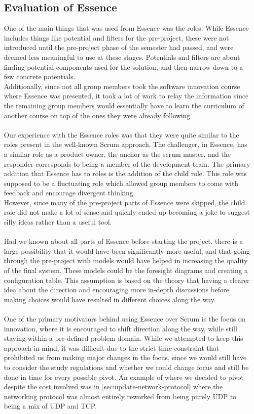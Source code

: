 \subsection{Evaluation of Essence}
One of the main things that was used from Essence was the roles.
While Essence includes things like potential and filters for the pre-project, these were not introduced until the pre-project phase of the semester had passed, and were deemed less meaningful to use at these stages.
Potentials and filters are about finding potential components used for the solution, and then narrow down to a few concrete potentials.\\
Additionally, since not all group members took the software innovation course where Essence was presented, it took a lot of work to relay the information since the remaining group members would essentially have to learn the curriculum of another course on top of the ones they were already following.
\\\\
Our experience with the Essence roles was that they were quite similar to the roles present in the well-known Scrum approach.
The challenger, in Essence, has a similar role as a product owner, the anchor as the scrum master, and the responder corresponds to being a member of the development team.
The primary addition that Essence has to roles is the addition of the child role.
This role was supposed to be a fluctuating role which allowed group members to come with feedback and encourage divergent thinking.\\
However, since many of the pre-project parts of Essence were skipped, the child role did not make a lot of sense and quickly ended up becoming a joke to suggest silly ideas rather than a useful tool.
\\\\
Had we known about all parts of Essence before starting the project, there is a large possibility that it would have been significantly more useful, and that going through the pre-project with models would have helped in increasing the quality of the final system.
These models could be the foresight diagrams and creating a configuration table.
This assumption is based on the theory that having a clearer idea about the direction and encouraging more in-depth discussions before making choices would have resulted in different choices along the way.
\\\\
One of the primary motivators behind using Essence over Scrum is the focus on innovation, where it is encouraged to shift direction along the way, while still staying within a pre-defined problem domain.
While we attempted to keep this approach in mind, it was difficult due to the strict time constraint that prohibited us from making major changes in the focus, since we would still have to consider the study regulations and whether we could change focus and still be done in time for every possible pivot.
An example of where we decided to pivot despite the cost involved was in \autoref{sec:update-network-protocol} where the networking protocol was almost entirely reworked from being purely UDP to being a mix of UDP and TCP.
